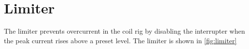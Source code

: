 



\newpage
\section{Limiter}
\label{sec:limiter}

The limiter prevents overcurrent in the coil rig by disabling the interrupter when the peak current rises above a preset level. The limiter is shown in \cref{fig:limiter}

